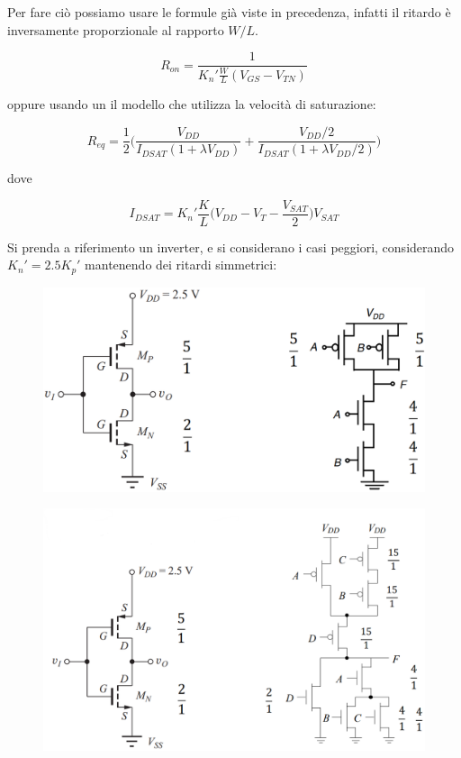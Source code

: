 Per fare ciò possiamo usare le formule già viste in precedenza, infatti il ritardo è inversamente proporzionale al rapporto $W/L$.

\begin{equation}
    R_{on} = \frac{1}{K_n'\frac{W}{L}(V_{GS} - V_{TN})}
\end{equation}

oppure usando un il modello che utilizza la velocità di saturazione:

\begin{equation*}
    R_{eq} = \frac{1}{2}\biggl(\frac{V_{DD}}{I_{DSAT}(1+\lambda V_{DD})} + \frac{V_{DD}/2}{I_{DSAT}(1+\lambda V_{DD}/2)}\biggl)
\end{equation*}

dove

\begin{equation*}
    I_{DSAT} = K_n' \frac{K}{L}\biggl(V_{DD} - V_T - \frac{V_{SAT}}{2}\biggl)V_{SAT}
\end{equation*}

Si prenda a	riferimento un	inverter,	e	si considerano i casi peggiori, considerando $K_n' = 2.5 K_p'$ mantenendo dei ritardi simmetrici:

\begin{figure}[htbp]
    \centering
    \includegraphics[width=0.7\linewidth]{img/dimensionamento.png}
\end{figure}


\begin{figure}[htbp]
    \centering
    \includegraphics[width=0.75\linewidth]{img/dim_cmos.png}   
    
\end{figure}


